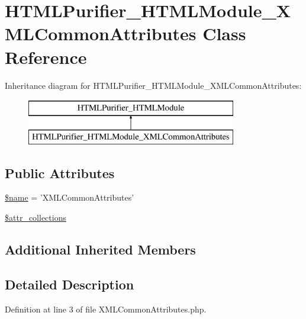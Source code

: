 \hypertarget{classHTMLPurifier__HTMLModule__XMLCommonAttributes}{\section{H\+T\+M\+L\+Purifier\+\_\+\+H\+T\+M\+L\+Module\+\_\+\+X\+M\+L\+Common\+Attributes Class Reference}
\label{classHTMLPurifier__HTMLModule__XMLCommonAttributes}
}
Inheritance diagram for H\+T\+M\+L\+Purifier\+\_\+\+H\+T\+M\+L\+Module\+\_\+\+X\+M\+L\+Common\+Attributes\+:\begin{figure}[H]
\begin{center}
\leavevmode
\includegraphics[height=2.000000cm]{classHTMLPurifier__HTMLModule__XMLCommonAttributes}
\end{center}
\end{figure}
\subsection*{Public Attributes}
\begin{DoxyCompactItemize}
\item 
\hyperlink{classHTMLPurifier__HTMLModule__XMLCommonAttributes_aa54863fead1c28bd1c48905f8860bdc4}{\$name} = 'X\+M\+L\+Common\+Attributes'
\item 
\hyperlink{classHTMLPurifier__HTMLModule__XMLCommonAttributes_a30b37c8810e0438162b3db739718d253}{\$attr\+\_\+collections}
\end{DoxyCompactItemize}
\subsection*{Additional Inherited Members}


\subsection{Detailed Description}


Definition at line 3 of file X\+M\+L\+Common\+Attributes.\+php.



